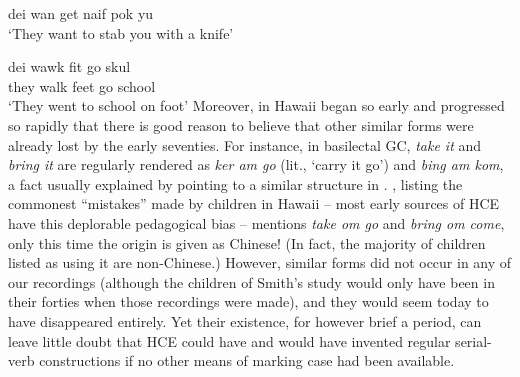 \ea\label{ex:2:263}
dei wan get naif pok yu\\
\glt `They want to stab you with a knife'
\z

\ea\label{ex:2:264}
\gll dei wawk fit go skul\\
they walk feet go school\\
\glt `They went to school on foot'
\z
Moreover,  in Hawaii began so early and progressed so rapidly that there is good reason to believe that other similar forms were already lost by the early seventies. For instance, in basilectal GC, \textit{take it} and \textit{bring it} are regularly rendered as \textit{ker am go} (lit., `carry it go') and \textit{bing am kom}, a fact usually explained by pointing to a similar structure in . \citet{Smith1939}, listing the commonest ``mistakes''
made by children in Hawaii -- most early sources of HCE have this deplorable pedagogical bias -- mentions \textit{take om go} and \textit{bring om come}, only this time the origin is given as Chinese! (In fact, the majority of children listed as using it are non-Chinese.) However, similar forms did not occur in any of our recordings (although the children of Smith's study would only have been in their forties when those recordings were made), and they would seem today to have disappeared entirely. Yet their existence, for however brief a period, can leave little doubt that HCE could have and would have invented regular serial-verb constructions if no other means of marking case had been available.%
